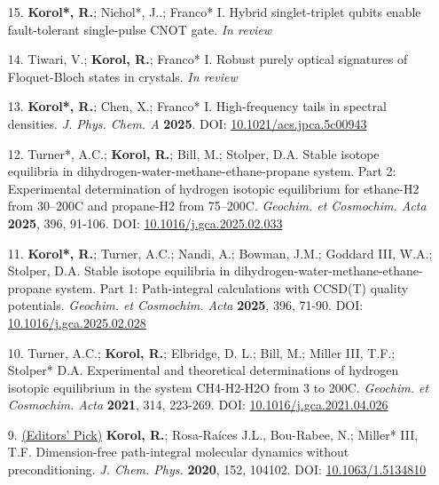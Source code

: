 
\begin{enumerate}
\item[15.] \textbf{Korol*, R.}; Nichol*, J..; Franco* I. Hybrid singlet-triplet qubits enable fault-tolerant single-pulse CNOT gate. \textit{In review}
\vspace{0.1cm}
\item[14.] Tiwari, V.; \textbf{Korol, R.}; Franco* I. Robust purely optical signatures of Floquet-Bloch states in crystals. \textit{In review}
\vspace{0.1cm}
\item[13.] \textbf{Korol*, R.}; Chen, X.; Franco* I. High-frequency tails in spectral densities. \textit{J. Phys. Chem. A} \textbf{2025}. DOI: \href{https://pubs.acs.org/doi/10.1021/acs.jpca.5c00943}{10.1021/acs.jpca.5c00943}
\vspace{0.1cm}
	\item[12.] Turner*, A.C.; \textbf{Korol, R.}; Bill, M.; Stolper, D.A. Stable isotope equilibria in dihydrogen-water-methane-ethane-propane system. Part 2: Experimental determination of hydrogen isotopic equilibrium for ethane-H2 from 30--200\degree C and propane-H2 from 75--200\degree C. \textit{Geochim. et Cosmochim. Acta} \textbf{2025}, 396, 91-106. DOI: \href{https://doi.org/10.1016/j.gca.2025.02.033}{10.1016/j.gca.2025.02.033}
	\vspace{0.1cm}
	\item[11.] \textbf{Korol*, R.}; Turner, A.C.; Nandi, A.; Bowman, J.M.; Goddard III, W.A.; Stolper, D.A. Stable isotope equilibria in dihydrogen-water-methane-ethane-propane system. Part 1: Path-integral calculations with CCSD(T) quality potentials. \textit{Geochim. et Cosmochim. Acta} \textbf{2025}, 396, 71-90. DOI: \href{https://doi.org/10.1016/j.gca.2025.02.028}{10.1016/j.gca.2025.02.028}
\vspace{0.1cm}
	\item[10.] Turner, A.C.; \textbf{Korol, R.}; Elbridge, D. L.; Bill, M.; Miller III, T.F.; Stolper* D.A.
Experimental and theoretical determinations of hydrogen isotopic equilibrium in the system CH4-H2-H2O from 3 to 200\degree C. \textit{Geochim. et Cosmochim. Acta} \textbf{2021}, 314, 223-269. DOI: \href{https://doi.org/10.1016/j.gca.2021.04.026}{10.1016/j.gca.2021.04.026}
\vspace{0.1cm}

	\item[9.] \underline{(Editors' Pick)} \textbf{Korol, R.}; Rosa-Ra\'ices J.L., Bou-Rabee,  N.; Miller* III, T.F. Dimension-free path-integral molecular dynamics without preconditioning. \textit{J. Chem. Phys.} \textbf{2020}, 152, 104102. DOI: \href{https://aip.scitation.org/doi/abs/10.1063/1.5134810}{10.1063/1.5134810}
\vspace{0.1cm}


\end{enumerate}
